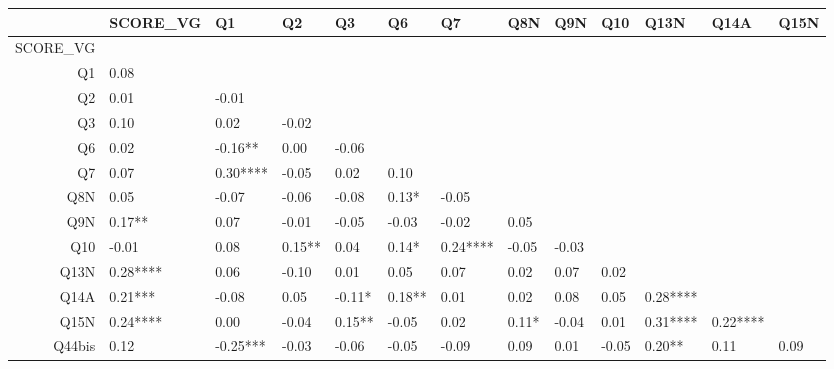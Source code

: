 \begin{table}[ht]
\centering
\begin{tabular}{rllllllllllll}
  \hline
 & SCORE\_VG & Q1 & Q2 & Q3 & Q6 & Q7 & Q8N & Q9N & Q10 & Q13N & Q14A & Q15N \\ 
  \hline
SCORE\_VG &  &  &  &  &  &  &  &  &  &  &  &  \\ 
  Q1 &  0.08     &  &  &  &  &  &  &  &  &  &  &  \\ 
  Q2 &  0.01     & -0.01     &  &  &  &  &  &  &  &  &  &  \\ 
  Q3 &  0.10     &  0.02     & -0.02     &  &  &  &  &  &  &  &  &  \\ 
  Q6 &  0.02     & -0.16**   &  0.00     & -0.06     &  &  &  &  &  &  &  &  \\ 
  Q7 &  0.07     &  0.30**** & -0.05     &  0.02     &  0.10     &  &  &  &  &  &  &  \\ 
  Q8N &  0.05     & -0.07     & -0.06     & -0.08     &  0.13*    & -0.05     &  &  &  &  &  &  \\ 
  Q9N &  0.17**   &  0.07     & -0.01     & -0.05     & -0.03     & -0.02     &  0.05     &  &  &  &  &  \\ 
  Q10 & -0.01     &  0.08     &  0.15**   &  0.04     &  0.14*    &  0.24**** & -0.05     & -0.03     &  &  &  &  \\ 
  Q13N &  0.28**** &  0.06     & -0.10     &  0.01     &  0.05     &  0.07     &  0.02     &  0.07     &  0.02     &  &  &  \\ 
  Q14A &  0.21***  & -0.08     &  0.05     & -0.11*    &  0.18**   &  0.01     &  0.02     &  0.08     &  0.05     &  0.28**** &  &  \\ 
  Q15N &  0.24**** &  0.00     & -0.04     &  0.15**   & -0.05     &  0.02     &  0.11*    & -0.04     &  0.01     &  0.31**** &  0.22**** &  \\ 
  Q44bis &  0.12     & -0.25***  & -0.03     & -0.06     & -0.05     & -0.09     &  0.09     &  0.01     & -0.05     &  0.20**   &  0.11     &  0.09     \\ 
   \hline
\end{tabular}
\end{table}
